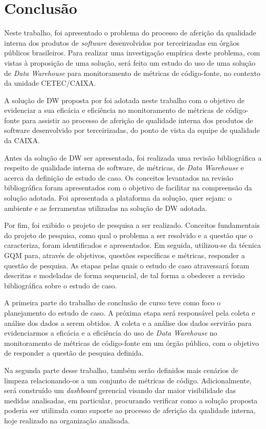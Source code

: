 \chapter{Conclusão}

Neste trabalho, foi apresentado o problema do processo de aferição da qualidade interna dos produtos de \textit{software} desenvolvidos por terceirizadas em órgãos públicos brasileiros. Para realizar uma investigação empírica deste problema, com vistas à proposição de uma solução, será feito um estudo do uso de uma solução de \textit{Data Warehouse} para monitoramento de métricas de código-fonte, no contexto da unidade CETEC/CAIXA.

A solução de DW proposta por  foi adotada neste trabalho com o objetivo de evidenciar a sua eficácia e eficiência no monitoramento de métricas de código-fonte para assistir ao processo de aferição de qualidade interna dos produtos de software desenvolvido por terceirizadas, do ponto de vista da equipe de qualidade da CAIXA. 

Antes da solução de DW ser apresentada, foi realizada uma revisão bibliográfica a respeito de qualidade interna de software, de métricas, de \textit{Data Warehouse} e acerca da definição de estudo de caso. Os conceitos levantados na revisão bibliográfica foram apresentados com o objetivo de facilitar na compreensão da solução adotada. Foi apresentada a plataforma da solução, quer sejam: o ambiente e as ferramentas utilizadas na solução de DW adotada. 

Por fim, foi  exibido o projeto de pesquisa a ser realizado. Conceitos fundamentais do projeto de pesquisa, como qual o problema a ser resolvido e a questão que o caracteriza, foram identificados e apresentados. Em seguida, utilizou-se da  técnica GQM para, através de objetivos, questões específicas e métricas, responder a questão de pesquisa. As etapas pelas quais o estudo de caso atravessará foram descritas e modeladas de forma sequencial, de tal forma a obedecer a revisão bibliográfica sobre o estudo de caso.

A primeira parte do trabalho de conclusão de curso teve como foco o planejamento do estudo de caso. A próxima etapa será responsável pela coleta e análise dos dados a serem obtidos. A coleta e a análise dos dados servirão para evidenciarmos a eficácia e a eficiência do uso de \textit{Data Warehouse} no monitoramento de métricas de código-fonte em um órgão público, com o objetivo de responder a questão de pesquisa definida.

Na segunda parte desse trabalho, também serão definidos mais cenários de limpeza relacionando-os a um conjunto de métricas de código. Adicionalmente, será construído um \textit{dashboard} gerencial visando dar maior visibilidade das medidas analisadas, em particular, procurando verificar como a solução proposta poderia ser utilizada como suporte ao processo de aferição da qualidade interna, hoje realizado na organização analisada.
